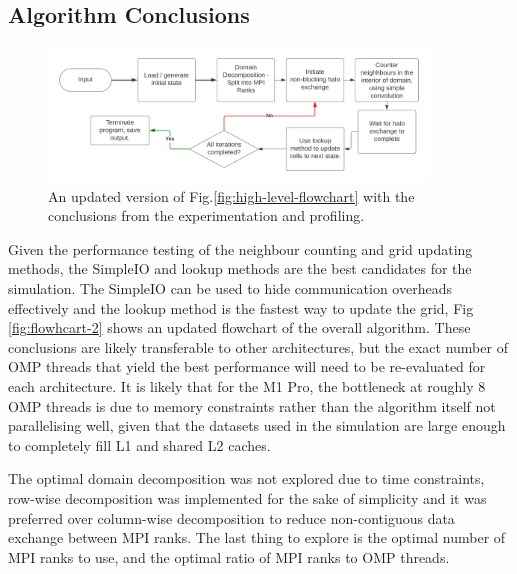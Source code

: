    \subsection{Algorithm Conclusions}\label{subsec:interim-conclusions}
    \begin{figure}[htb]
    \centering
    \includegraphics[width=0.9\textwidth]{./figures/flowchat-2}
    \caption{An updated version of Fig.\eqref{fig:high-level-flowchart} with the conclusions from the experimentation
    and profiling.}
    \label{fig:flowhcart-2}
    \end{figure}
    Given the performance testing of the neighbour counting and grid updating methods, the SimpleIO and lookup methods
    are the best candidates for the simulation.
    The SimpleIO can be used to hide communication overheads effectively and the lookup method is the fastest way to
    update the grid, Fig \eqref{fig:flowhcart-2} shows an updated flowchart of the overall algorithm.
    These conclusions are likely transferable to other architectures, but the exact number of OMP threads that yield
    the best performance will need to be re-evaluated for each architecture.
    It is likely that for the M1 Pro, the bottleneck at roughly 8 OMP threads is due to memory constraints rather
    than the algorithm itself not parallelising well, given that the datasets used in the simulation are large enough
    to completely fill L1 and shared L2 caches.

    The optimal domain decomposition was not explored due to time constraints, row-wise decomposition was implemented
    for the sake of simplicity and it was preferred over column-wise decomposition to reduce non-contiguous data
    exchange between MPI ranks.
    The last thing to explore is the optimal number of MPI ranks to use, and the optimal ratio of MPI ranks to OMP threads.

